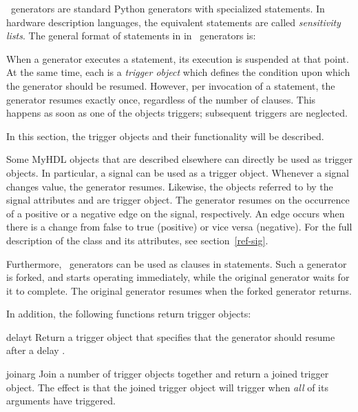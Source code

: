 \myhdl\ generators are standard Python generators with specialized
 statements. In hardware description languages, the equivalent
statements are called 
\emph{sensitivity lists}. The general format
of  statements in in \myhdl\ generators is:

\hspace{\leftmargin} 

When a generator executes a  statement, its
execution is suspended at that point. At the same time, each
 is a \emph{trigger object} which defines the condition
upon which the generator should be resumed. However, per invocation of a
 statement, the generator resumes exactly once,
regardless of the number of clauses. This happens as soon as one
of the objects triggers; subsequent triggers are
neglected.

In this section, the trigger objects and their functionality will be
described.

Some MyHDL objects that are described elsewhere can directly be used
as trigger objects. In particular, a signal can be used as
a trigger object. Whenever a signal changes value, the generator
resumes. Likewise, the objects referred to by the signal attributes
 and  are trigger object. The generator
resumes on the occurrence of a positive or a negative edge on the
signal, respectively. An edge occurs when there is a change from
false to true (positive) or vice versa (negative).
For the full description of the  class and its
attributes, see section~\ref{ref-sig}.

Furthermore, \myhdl\ generators can be used as clauses in 
statements. Such a generator is forked, and starts operating
immediately, while the original generator
waits for it to complete. The original generator resumes when the
forked generator returns.


In addition, the following functions return trigger objects:

\begin{funcdesc}{delay}{t}
Return a trigger object that specifies that the generator should
resume after a delay .
\end{funcdesc}

\begin{funcdesc}{join}{arg }
Join a number of trigger objects together and return a joined
trigger object.  The effect is that the joined trigger object will
trigger when \emph{all} of its arguments have triggered.
\end{funcdesc}


